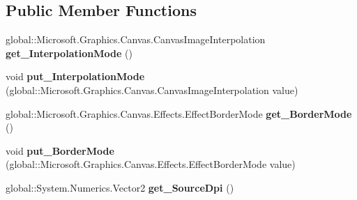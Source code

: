 \subsection*{Public Member Functions}
\begin{DoxyCompactItemize}
\item 
\mbox{\label{interface_microsoft_1_1_graphics_1_1_canvas_1_1_effects_1_1_i_dpi_compensation_effect_ac5e4888783e519ac1ef3cca2949f28c8}} 
global\+::\+Microsoft.\+Graphics.\+Canvas.\+Canvas\+Image\+Interpolation {\bfseries get\+\_\+\+Interpolation\+Mode} ()
\item 
\mbox{\label{interface_microsoft_1_1_graphics_1_1_canvas_1_1_effects_1_1_i_dpi_compensation_effect_a9dc002b657a33313f9c1e53d96297e13}} 
void {\bfseries put\+\_\+\+Interpolation\+Mode} (global\+::\+Microsoft.\+Graphics.\+Canvas.\+Canvas\+Image\+Interpolation value)
\item 
\mbox{\label{interface_microsoft_1_1_graphics_1_1_canvas_1_1_effects_1_1_i_dpi_compensation_effect_a76445b947278b23789ac880d8cc5fc6a}} 
global\+::\+Microsoft.\+Graphics.\+Canvas.\+Effects.\+Effect\+Border\+Mode {\bfseries get\+\_\+\+Border\+Mode} ()
\item 
\mbox{\label{interface_microsoft_1_1_graphics_1_1_canvas_1_1_effects_1_1_i_dpi_compensation_effect_ade5071aec175affb5d564c3ff21ab872}} 
void {\bfseries put\+\_\+\+Border\+Mode} (global\+::\+Microsoft.\+Graphics.\+Canvas.\+Effects.\+Effect\+Border\+Mode value)
\item 
\mbox{\label{interface_microsoft_1_1_graphics_1_1_canvas_1_1_effects_1_1_i_dpi_compensation_effect_a52343f4e5f636dfc6a505f71e277c49f}} 
global\+::\+System.\+Numerics.\+Vector2 {\bfseries get\+\_\+\+Source\+Dpi} ()
\item 
\mbox{\label{interface_microsoft_1_1_graphics_1_1_canvas_1_1_effects_1_1_i_dpi_compensation_effect_ae37090d897dfa337b42f53e5dc0b69bd}} 

\end{DoxyCompactItemize}
